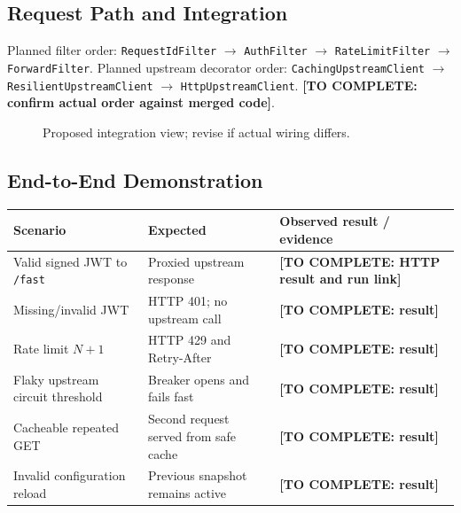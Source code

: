\documentclass[12pt,a4paper]{article}
\newcommand{\todo}[1]{\textcolor{red!70!black}{\textbf{[TO COMPLETE: #1]}}}
\begin{document}
\subsection{Request Path and Integration}
Planned filter order: \texttt{RequestIdFilter} $\rightarrow$ \texttt{AuthFilter} $\rightarrow$ \texttt{RateLimitFilter} $\rightarrow$ \texttt{ForwardFilter}. Planned upstream decorator order: \texttt{CachingUpstreamClient} $\rightarrow$ \texttt{ResilientUpstreamClient} $\rightarrow$ \texttt{HttpUpstreamClient}. \todo{confirm actual order against merged code}.
\begin{figure}[H]\centering
{}
\caption{Proposed integration view; revise if actual wiring differs.}\end{figure}
\subsection{End-to-End Demonstration}
\begin{longtable}{L{4.3cm} L{4.2cm} L{4.1cm}}\toprule
\textbf{Scenario} & \textbf{Expected} & \textbf{Observed result / evidence}\\\midrule\endhead
Valid signed JWT to \texttt{/fast} & Proxied upstream response & \todo{HTTP result and run link}\\
Missing/invalid JWT & HTTP 401; no upstream call & \todo{result}\\
Rate limit $N+1$ & HTTP 429 and Retry-After & \todo{result}\\
Flaky upstream circuit threshold & Breaker opens and fails fast & \todo{result}\\
Cacheable repeated GET & Second request served from safe cache & \todo{result}\\
Invalid configuration reload & Previous snapshot remains active & \todo{result}\\\bottomrule\end{longtable}
\end{document}
